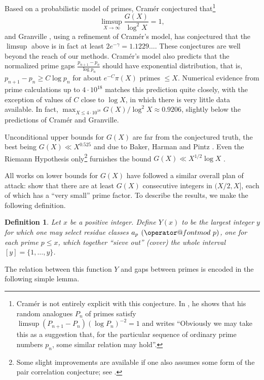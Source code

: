 \documentclass[12pt]{amsart}
\makeatletter
\numberwithin{equation}{section}  %
\theoremstyle{remark}
\theoremstyle{plain}
\newtheorem{definition}{Definition}
\numberwithin{equation}{section}
\renewcommand{\pmod}[1]{\allowbreak\mkern7mu({\operator@font mod}\,\,#1)}
\renewcommand{\le}{\leqslant}
\renewcommand{\leq}{\leqslant}
\renewcommand{\ge}{\geqslant}
\renewcommand{\(}{\left(}
\renewcommand{\)}{\right)}
\makeatother
\begin{document}
Based on a probabilistic model of primes, Cram\'er \cite{Cra} conjectured
that\footnote{Cram\'er is not entirely explicit with this conjecture.
In \cite{Cra}, he shows that his random analogues $P_n$ of
primes satisfy $\limsup (P_{n+1}-P_n)(\log P_n)^{-2}=1$ and writes ``Obviously we
may take this as a suggestion that, for the particular sequence of
ordinary prime numbers $p_n$, some similar relation may hold''.}
\[
\limsup_{X\to\infty} \frac{G(X)}{\log^2 X} = 1, 
\]
and Granville \cite{Gra}, using a refinement of Cram\'er's model,
has conjectured that the $\limsup$ above is in fact at least $2e^{-\gamma}=1.1229\ldots$.  These conjectures are well beyond the reach of our methods.
Cram\'er's model also predicts that the normalized prime gaps
$\frac{p_{n+1}-p_n}{\log p_n}$ should have exponential distribution, that is,
$p_{n+1}-p_n \ge C\log p_n$ for about $e^{-C}\pi(X)$ primes $\le X$.
Numerical evidence from prime calculations up to 
$4\cdot 10^{18}$ \cite{numerical-tos}
matches this prediction quite closely, with the exception of values of $C$
close to $\log X$, in which there is very little data available.  In fact,
$\max_{X\le 4\cdot 10^{18}} G(X)/\log^2 X \approx 0.9206$, slightly below the
predictions of Cram\'er and Granville.

Unconditional upper bounds for $G(X)$ are far from the conjectured
truth, the best being
$G(X) \ll X^{0.525}$ and due to Baker, Harman and Pintz \cite{BHP}.
Even the Riemann Hypothesis only\footnote{Some slight improvements are available if one also assumes some form of the pair correlation conjecture; see \cite{heath}.} furnishes the bound $G(X)\ll X^{1/2}\log X$ \cite{Cra1920}.

All works on lower bounds for $G(X)$ have followed a similar overall plan
of attack: show that there are at least $G(X)$ consecutive
integers in $(X/2,X]$, 
each of which has a ``very small'' prime factor.  
To describe the results, we make the following definition.

\begin{definition}\label{y-def}
Let $x$ be a positive integer. Define $Y(x)$ to be the largest integer $y$ for which one may select residue classes $a_p \pmod{p}$, one for each prime $p \leq x$, which together ``sieve out'' (cover) the whole interval $[y] = \{1,\dots,y\}$.
\end{definition}

The relation between this function $Y$ and gaps between primes is encoded in the following simple lemma.
\end{document}
